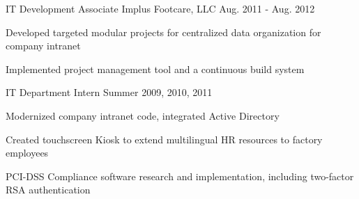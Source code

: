 \begin{cventries}
  \cventry
    {IT Development Associate}
    {Implus Footcare, LLC}
    {}
    {Aug. 2011 - Aug. 2012}
    {
      \begin{cvitems}
        \item Developed targeted modular projects for centralized data organization for company intranet
        \item Implemented project management tool and a continuous build system
      \end{cvitems}
    }

  \cventry
  {IT Department Intern}
  {}
  {}
  {Summer 2009, 2010, 2011}
  {
    \begin{cvitems}
      \item Modernized company intranet code, integrated Active Directory
      \item Created touchscreen Kiosk to extend multilingual HR resources to factory employees
      \item PCI-DSS Compliance software research and implementation, including two-factor RSA authentication
    \end{cvitems}
  }

\end{cventries}
